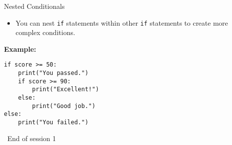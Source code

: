 \documentclass[serif, aspectratio=169]{beamer}
\begin{document}
\begin{frame}[fragile]{Nested Conditionals}
    \begin{itemize}[<+-| alert@+>] %
        \item You can nest \texttt{if} statements within other \texttt{if} statements to create more complex conditions.
    \end{itemize}
    \vspace{0.5cm}
    \textbf{Example:}
    \begin{verbatim}
if score >= 50:
    print("You passed.")
    if score >= 90:
        print("Excellent!")
    else:
        print("Good job.")
else:
    print("You failed.")
    \end{verbatim}
\end{frame}


\begin{frame}
    \begin{center}
        {\Huge\ End of session 1}
    \end{center}
\end{frame}
\end{document}
